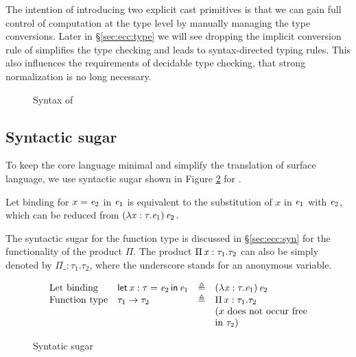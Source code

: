 The intention of introducing two explicit cast primitives is that we can gain full control of computation at the type level by manually managing the type conversions. Later in \S \ref{sec:ecc:type} we will see dropping the implicit conversion rule of \cc simplifies the type checking and leads to syntax-directed typing rules. This also influences the requirements of decidable type checking, that strong normalization is no long necessary.

\begin{figure}[ht]
	\gram{\ottee\ottinterrule
		\otts\ottinterrule
		\ottG\ottinterrule
		\ottv}
	\caption{Syntax of \expcc}
	\label{fig:ecc:syntax}
\end{figure}

\subsection{Syntactic sugar}

To keep the core language minimal and simplify the translation of surface language, we use syntactic sugar shown in Figure \ref{fig:ecc:sugar} for \expcc.

Let binding for $x=\mathit{e_{{\mathrm{2}}}}$ in $\mathit{e_{{\mathrm{1}}}}$ is equivalent to the substitution of $x$ in $\mathit{e_{{\mathrm{1}}}}$ with $\mathit{e_{{\mathrm{2}}}}$, which can be reduced from $(  \lambda  \mathit{x}  :  \tau  .  \mathit{e_{{\mathrm{1}}}}  ) \, \mathit{e_{{\mathrm{2}}}}$.

The syntactic sugar for the function type is discussed in \S \ref{sec:ecc:syn} for the functionality of the product $ \Pi $. The product $\Pi \, \mathit{x}  :  \tau_{{\mathrm{1}}}  .  \tau_{{\mathrm{2}}}$ can also be simply denoted by $ \Pi  \_ : \tau_{{\mathrm{1}}} . \tau_{{\mathrm{2}}}$, where the underscore stands for an anonymous variable.

\begin{figure}[ht]
	\centering
	\[
	\begin{array}{llll}
	\text{Let binding} & \mathsf{let} \, \mathit{x}  :  \tau  =  \mathit{e_{{\mathrm{2}}}} \, \mathsf{in} \, \mathit{e_{{\mathrm{1}}}} & \triangleq & (  \lambda  \mathit{x}  :  \tau  .  \mathit{e_{{\mathrm{1}}}}  ) \, \mathit{e_{{\mathrm{2}}}} \\
	\text{Function type} & \tau_{{\mathrm{1}}}  \rightarrow  \tau_{{\mathrm{2}}} & \triangleq & \Pi \, \mathit{x}  :  \tau_{{\mathrm{1}}}  .  \tau_{{\mathrm{2}}}\\
	&&& \text{($x$ does not occur free}\\
	&&& \text{in $\tau_{{\mathrm{2}}}$)}
	\end{array}
	\]
	\caption{Syntatic sugar}
	\label{fig:ecc:sugar}
\end{figure}

